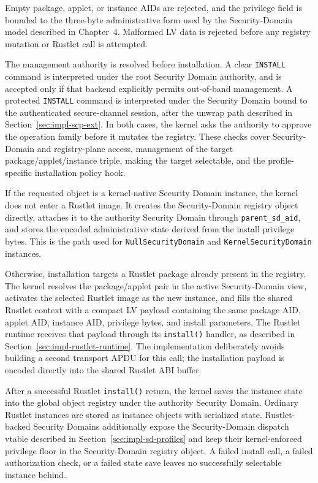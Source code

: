 Empty package, applet, or instance AIDs are rejected, and the privilege field
is bounded to the three-byte administrative form used by the Security-Domain
model described in Chapter~4. Malformed LV data is rejected before any registry
mutation or Rustlet call is attempted.

The management authority is resolved before installation. A clear
\texttt{INSTALL} command is interpreted under the root Security Domain
authority, and is accepted only if that backend explicitly permits out-of-band
management. A protected \texttt{INSTALL} command is interpreted under the
Security Domain bound to the authenticated secure-channel session, after the
unwrap path described in Section~\ref{sec:impl-scp-ext}. In both cases, the
kernel asks the authority to approve the operation family before it mutates the
registry. These checks cover Security-Domain and registry-plane access,
management of the target package/applet/instance triple, making the target
selectable, and the profile-specific installation policy hook.

If the requested object is a kernel-native Security Domain instance, the
kernel does not enter a Rustlet image. It creates the Security-Domain registry
object directly, attaches it to the authority Security Domain through
\texttt{parent\_sd\_aid}, and stores the encoded administrative state derived
from the install privilege bytes. This is the path used for
\texttt{NullSecurityDomain} and \texttt{KernelSecurityDomain} instances.

Otherwise, installation targets a Rustlet package already present in the
registry. The kernel resolves the package/applet pair in the active
Security-Domain view, activates the selected Rustlet image as the new instance,
and fills the shared Rustlet context with a compact LV payload containing the
same package AID, applet AID, instance AID, privilege bytes, and install
parameters. The Rustlet runtime receives that payload through its
\texttt{install()} handler, as described in
Section~\ref{sec:impl-rustlet-runtime}. The implementation deliberately avoids
building a second transport APDU for this call; the installation payload is
encoded directly into the shared Rustlet ABI buffer.

After a successful Rustlet \texttt{install()} return, the kernel saves the
instance state into the global object registry under the authority Security
Domain. Ordinary Rustlet instances are stored as instance objects with
serialized state. Rustlet-backed Security Domains additionally expose the
Security-Domain dispatch vtable described in Section~\ref{sec:impl-sd-profiles}
and keep their kernel-enforced privilege floor in the Security-Domain registry
object. A failed install call, a failed authorization check, or a failed state
save leaves no successfully selectable instance behind.

